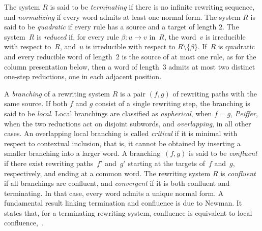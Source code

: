 \documentclass[a4paper, twoside, 11pt, english]{article}
\theoremstyle{plain}
\theoremstyle{definition}
\newcommand{\fl}{\rightarrow}
\begin{document}
The system $R$ is said to be \emph{terminating} if there is no infinite rewriting sequence,
and \emph{normalizing} if every word admits at least one normal form.
The system $R$ is said to be \emph{quadratic} if every rule has a source and a target of length $2$.
The system~$R$ is \emph{reduced} if, for every rule
$\beta:u\fl v$ in~$R$, the word~$v$ is irreducible with
respect to~$R$, and~$u$ is irreducible with respect to
$R\setminus\{\beta\}$.
If~$R$ is quadratic and every reducible word of length~$2$ is the source of at most one rule, as for the column
presentation below, then a word of length~$3$ admits at most two distinct one-step reductions, one in each adjacent position.

A \emph{branching} of a rewriting system $R$ is a pair $(f,g)$ of rewriting paths with the same source.
If both $f$ and $g$ consist of a single rewriting step, the branching is said to be \emph{local}.
Local branchings are classified as \emph{aspherical}, when $f=g$,  \emph{Peiffer}, when the two reductions act on disjoint subwords, and  \emph{overlapping}, in all other cases.
An overlapping local branching is called \emph{critical} if it is minimal with respect to contextual inclusion,
that is, it cannot be obtained by inserting a smaller branching into a larger word.
A branching~$(f,g)$ is said to be \emph{confluent} if there exist rewriting paths~$f'$ and~$g'$ starting at the targets of~$f$ and~$g$, respectively, and ending at a common word.
The rewriting system $R$ is \emph{confluent} if all branchings are confluent,
and \emph{convergent} if it is both confluent and terminating.
In that case, every word admits a unique normal form. A fundamental result linking termination and confluence is due to Newman.
It states that, for a terminating rewriting system, confluence is equivalent
to local confluence,~\cite{Newman42,BookOtto93}.
\end{document}
